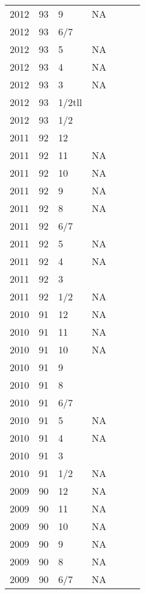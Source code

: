 \begin{longtable}{ |l|l|l|l|p{2.7cm}|l|p{2cm}| }
 2012 & 93 & 9     &    NA   &  &  & \\
 2012 & 93 &   6/7 &         &  &  & \\
 2012 & 93 &     5 &    NA   &  &  & \\
 2012 & 93 &     4 &    NA   &  &  & \\
 2012 & 93 &     3 &    NA   &  &  & \\
 2012 & 93 & 1/2tll&         &  &  & \\
 2012 & 93 &   1/2 &         &  &  & \\
 2011 & 92 &    12 &         &  &  & \\
 2011 & 92 &    11 &    NA   &  &  & \\
 2011 & 92 &    10 &    NA   &  &  & \\
 2011 & 92 &     9 &    NA   &  &  & \\
 2011 & 92 &     8 &    NA   &  &  & \\
 2011 & 92 &   6/7 &         &  &  & \\
 2011 & 92 &     5 &     NA  &  &  & \\
 2011 & 92 &     4 &     NA  &  &  & \\
 2011 & 92 &     3 &         &  &  & \\
 2011 & 92 &   1/2 &     NA  &  &  & \\
 2010 & 91 &   12  &      NA &  &  & \\
 2010 & 91 &    11 &      NA &  &  & \\
 2010 & 91 &    10 &      NA &  &  & \\
 2010 & 91 &     9 &         &  &  & \\
 2010 & 91 &     8 &         &  &  & \\
 2010 & 91 &   6/7 &         &  &  & \\
 2010 & 91 &     5 &     NA  &  &  & \\
 2010 & 91 &     4 &     NA  &  &  & \\
 2010 & 91 &     3 &         &  &  & \\
 2010 & 91 &   1/2 &      NA &  &  & \\
 2009 & 90 &    12 &      NA &  &  & \\
 2009 & 90 &    11 &      NA &  &  & \\
 2009 & 90 &    10 &      NA &  &  & \\
 2009 & 90 &     9 &      NA &  &  & \\
 2009 & 90 &     8 &      NA &  &  & \\
 2009 & 90 &   6/7 &      NA &  &  & \\

\end{longtable}
